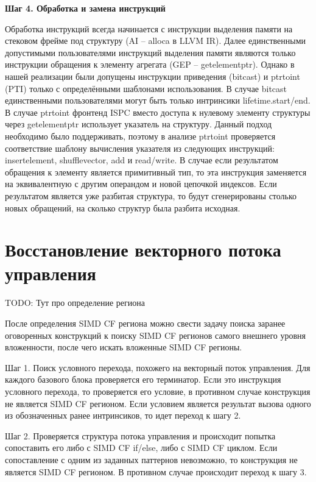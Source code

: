 \textbf{Шаг 4. Обработка и замена инструкций}

Обработка инструкций всегда начинается с инструкции выделения памяти на стековом фрейме под структуру (AI -- alloca в LLVM IR).
Далее единственными допустимыми пользователями инструкций выделения памяти являются только инструкции обращения к элементу агрегата (GEP -- getelementptr).
Однако в нашей реализации были допущены инструкции приведения (bitcast) и ptrtoint (PTI) только с определёнными шаблонами использования.
В случае bitcast единственными пользователями могут быть только интринсики lifetime.start/end.
В случае ptrtoint фронтенд ISPC вместо доступа к нулевому элементу структуры через getelementptr использует указатель на структуру.
Данный подход необходимо было поддерживать, поэтому в анализе ptrtoint проверяется соответствие шаблону вычисления указателя из следующих инструкций: insertelement, shufflevector, add и read/write.
В случае если результатом обращения к элементу является примитивный тип, то эта инструкция заменяется на эквивалентную с другим операндом и новой цепочкой индексов.
Если результатом является уже разбитая структура, то будут сгенерированы столько новых обращений, на сколько структур была разбита исходная.

\section{Восстановление векторного потока управления}\label{sec:lowering/simdcf}

TODO: Тут про определение региона

После определения SIMD CF региона можно свести задачу поиска заранее оговоренных конструкций к поиску SIMD CF регионов самого внешнего уровня вложенности, после чего искать вложенные SIMD CF регионы.

Шаг 1. Поиск условного перехода, похожего на векторный поток управления. Для
каждого базового блока проверяется его терминатор. Если это инструкция условного
перехода, то проверяется его условие, в противном случае конструкция не является
SIMD CF регионом. Если условием является результат вызова одного из обозначенных
ранее интринсиков, то идет переход к шагу 2.

Шаг 2. Проверяется структура потока управления и происходит попытка сопоставить
его либо с SIMD CF if/else, либо с SIMD CF циклом. Если сопоставление с одним из
заданных паттернов невозможно, то конструкция не является SIMD CF регионом. В
противном случае происходит переход к шагу 3.

